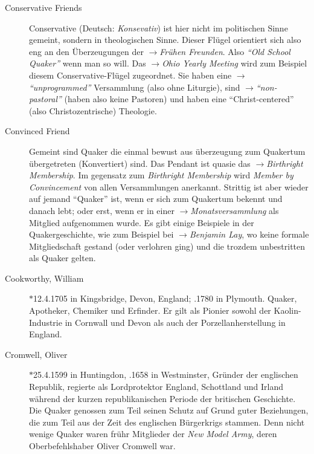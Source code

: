 \begin{description}
 \item[Conservative Friends] Conservative (Deutsch: \textit{Konsevativ}) ist
hier nicht im politischen Sinne gemeint, sondern in theologischen Sinne. Dieser
Flügel orientiert sich also eng an den Überzeugungen der $\to$\textit{Frühen
Freunden}. Also \textit{"`Old School Quaker"'} wenn man so will. Das
$\to$\textit{Ohio Yearly Meeting} wird zum Beispiel diesem
Conservative-Flügel zugeordnet. Sie haben eine $\to$\textit{"`unprogrammed"'}
Versammlung (also ohne Liturgie), sind $\to$\textit{"`non-pastoral"'} (haben
also keine Pastoren) und haben eine "`Christ-centered"' (also Christozentrische)
Theologie.

 \item[Convinced Friend] Gemeint sind Quaker die einmal bewust aus überzeugung
zum Quakertum übergetreten (Konvertiert) sind. Das Pendant ist quasie das
$\to$\textit{Birthright Membership}. Im gegensatz zum \textit{Birthright
Membership} wird \textit{Member by Convincement} von allen Versammlungen
anerkannt. Strittig ist aber wieder auf jemand "`Quaker"' ist, wenn er sich zum
Quakertum bekennt und danach lebt; oder erst, wenn er in einer
$\to$\textit{Monatsversammlung} als Mitglied aufgenommen wurde. Es gibt einige
Beispiele in der Quakergeschichte, wie zum Beispiel bei $\to$\textit{Benjamin
Lay}, wo keine formale Mitgliedschaft gestand (oder verlohren ging) und die
trozdem unbestritten als Quaker gelten.

 \item[Cookworthy, William]$\ast$12.4.1705 in Kingsbridge, Devon, England;
.1780 in Plymouth. Quaker, Apotheker, Chemiker und Erfinder. Er gilt
als Pionier sowohl der Kaolin-Industrie in Cornwall und Devon als auch der
Porzellanherstellung in England.

 \item[Cromwell, Oliver] $\ast$25.4.1599 in Huntingdon, .1658 in
Westminster, Gründer der englischen Republik, regierte als Lordprotektor
England, Schottland und Irland während der kurzen republikanischen Periode der
britischen Geschichte. Die Quaker genossen zum Teil seinen Schutz auf Grund
guter Beziehungen, die zum Teil aus der Zeit des englischen Bürgerkrigs stammen.
Denn nicht wenige Quaker waren frühr Mitglieder der \textit{New Model Army},
deren Oberbefehlshaber Oliver Cromwell war.

 \end{description}

\normalsize